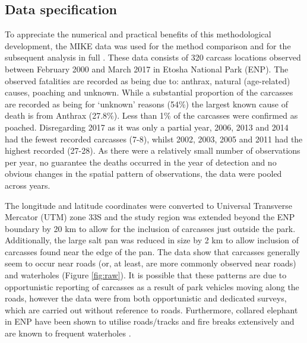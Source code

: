\documentclass[letterpaper]{interact}
\begin{document}
\subsection{Data specification}\label{data-specification}

To appreciate the numerical and practical benefits of this methodological development, the MIKE data was used for the method comparison and for the subsequent analysis in full \cite{mike2018}. These data consists of 320 carcass locations observed between February 2000 and March 2017 in Etosha National Park (ENP). The observed fatalities are recorded as being due to: anthrax, natural (age-related) causes, poaching and unknown. While a substantial proportion of the carcasses are recorded as being for `unknown' reasons (54\%) the largest known cause of death is from Anthrax (27.8\%). Less than 1\% of the carcasses were confirmed as poached.  Disregarding 2017 as it was only a partial year, 2006, 2013 and 2014 had the fewest recorded carcasses (7-8), whilst 2002, 2003, 2005 and 2011 had the highest recorded (27-28). As there were a relatively small number of observations per year, no guarantee the deaths occurred in the year of detection and no obvious changes in the spatial pattern of observations, the data were pooled across years. 

The longitude and latitude coordinates were converted to Universal Transverse Mercator (UTM) zone 33S and the study region was extended beyond the ENP boundary by 20 km to allow for the inclusion of carcasses just outside the park. Additionally, the large salt pan was reduced in size by 2 km to allow inclusion of carcasses found near the edge of the pan.  The data show that carcasses generally seem to occur near roads (or, at least, are more commonly observed near roads) and waterholes (Figure \ref{fig:raw}). It is possible that these patterns are due to opportunistic reporting of carcasses as a result of park vehicles moving along the roads, however the data were from both opportunistic and dedicated surveys, which are carried out without reference to roads. Furthermore, collared elephant in ENP have been shown to utilise roads/tracks and fire breaks extensively and are known to frequent waterholes \cite{Tsalyuk2019}.
\end{document}

